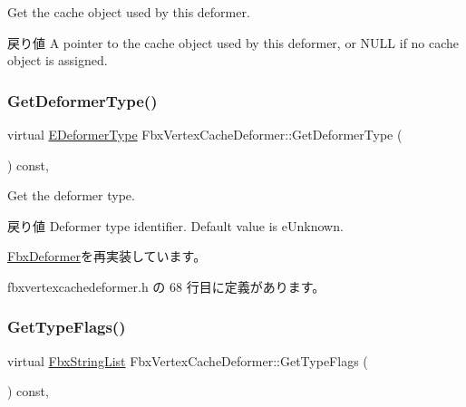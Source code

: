 Get the cache object used by this deformer. \begin{DoxyReturn}{戻り値}
A pointer to the cache object used by this deformer, or {\ttfamily N\+U\+LL} if no cache object is assigned. 
\end{DoxyReturn}
\mbox{\label{class_fbx_vertex_cache_deformer_ab213400e170fe58699649acaf652c787}} 
\subsubsection{\texorpdfstring{Get\+Deformer\+Type()}{GetDeformerType()}}
{\footnotesize\ttfamily virtual \hyperlink{class_fbx_deformer_a07e2cfb767191ba5c8799fdfbfe3eaf6}{E\+Deformer\+Type} Fbx\+Vertex\+Cache\+Deformer\+::\+Get\+Deformer\+Type (\begin{DoxyParamCaption}{ }\end{DoxyParamCaption}) const\hspace{0.3cm}{\ttfamily [inline]}, {\ttfamily [virtual]}}

Get the deformer type. \begin{DoxyReturn}{戻り値}
Deformer type identifier. Default value is e\+Unknown. 
\end{DoxyReturn}


\hyperlink{class_fbx_deformer_adbc586e383f788f24d7fce9ed859d481}{Fbx\+Deformer}を再実装しています。



 fbxvertexcachedeformer.\+h の 68 行目に定義があります。

\mbox{\label{class_fbx_vertex_cache_deformer_a67322e24180497b1f268cad5ed29c08b}} 
\subsubsection{\texorpdfstring{Get\+Type\+Flags()}{GetTypeFlags()}}
{\footnotesize\ttfamily virtual \hyperlink{class_fbx_string_list}{Fbx\+String\+List} Fbx\+Vertex\+Cache\+Deformer\+::\+Get\+Type\+Flags (\begin{DoxyParamCaption}{ }\end{DoxyParamCaption}) const\hspace{0.3cm}{\ttfamily [protected]}, {\ttfamily [virtual]}}



